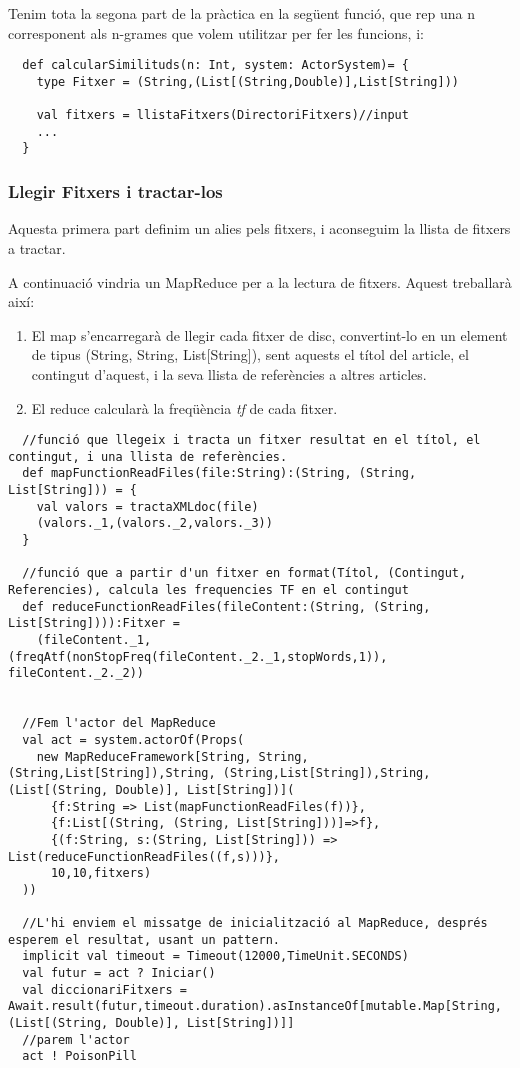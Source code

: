 \documentclass[11pt,a4paper,twoside]{report}
\begin{document}
Tenim tota la segona part de la pràctica en la següent funció, que rep una n corresponent als n-grames que volem utilitzar per fer les funcions, i:

\begin{lstlisting}
  def calcularSimilituds(n: Int, system: ActorSystem)= {
    type Fitxer = (String,(List[(String,Double)],List[String]))

    val fitxers = llistaFitxers(DirectoriFitxers)//input
    ...
  }
\end{lstlisting}

\subsubsection{Llegir Fitxers i tractar-los}

Aquesta primera part definim un alies pels fitxers, i aconseguim la llista de fitxers a tractar.

A continuació vindria un MapReduce per a la lectura de fitxers. Aquest treballarà així:
\begin{enumerate}
  \item El map s'encarregarà de llegir cada fitxer de disc, convertint-lo en un element de tipus (String, String, List[String]), sent aquests el títol del article, el contingut d'aquest, i la seva llista de referències a altres articles.
  \item El reduce calcularà la freqüència \textit{tf} de cada fitxer.
\end{enumerate}

\begin{lstlisting}
  //funció que llegeix i tracta un fitxer resultat en el títol, el contingut, i una llista de referències.
  def mapFunctionReadFiles(file:String):(String, (String, List[String])) = {
    val valors = tractaXMLdoc(file)
    (valors._1,(valors._2,valors._3))
  }

  //funció que a partir d'un fitxer en format(Títol, (Contingut, Referencies), calcula les frequencies TF en el contingut
  def reduceFunctionReadFiles(fileContent:(String, (String, List[String]))):Fitxer =
    (fileContent._1, (freqAtf(nonStopFreq(fileContent._2._1,stopWords,1)), fileContent._2._2))


  //Fem l'actor del MapReduce
  val act = system.actorOf(Props(
    new MapReduceFramework[String, String, (String,List[String]),String, (String,List[String]),String, (List[(String, Double)], List[String])](
      {f:String => List(mapFunctionReadFiles(f))},
      {f:List[(String, (String, List[String]))]=>f},
      {(f:String, s:(String, List[String])) => List(reduceFunctionReadFiles((f,s)))},
      10,10,fitxers)
  ))

  //L'hi enviem el missatge de inicialització al MapReduce, després esperem el resultat, usant un pattern.
  implicit val timeout = Timeout(12000,TimeUnit.SECONDS)
  val futur = act ? Iniciar()
  val diccionariFitxers = Await.result(futur,timeout.duration).asInstanceOf[mutable.Map[String, (List[(String, Double)], List[String])]]
  //parem l'actor
  act ! PoisonPill
\end{lstlisting}
\end{document}
